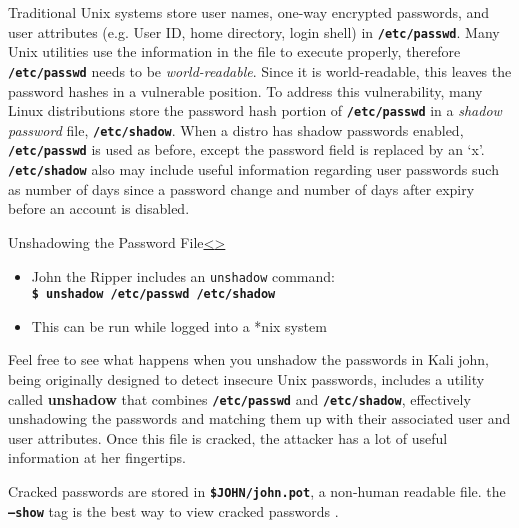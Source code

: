 \documentclass[12pt]{article}
\newcommand{\code}[1]{\texttt{\bfseries#1}}
\newenvironment{instructionblock}{\Large\bgroup}{\egroup}
\begin{document}
Traditional Unix systems store user names, one-way encrypted passwords, and user attributes (e.g. User ID, home directory, login shell) in \code{/etc/passwd}. Many Unix utilities use the information in the file to execute properly, therefore \code{/etc/passwd} needs to be \textit{world-readable}. Since it is world-readable, this leaves the password hashes in a vulnerable position. To address this vulnerability, many Linux distributions store the password hash portion of \code{/etc/passwd} in a \textit{shadow password} file, \code{/etc/shadow}.
When a distro has shadow passwords enabled, \code{/etc/passwd} is used as before, except the password field is replaced by an `x'. \code{/etc/shadow} also may include useful information regarding user passwords such as number of days since a password change and number of days after expiry before an account is disabled. \cite{frampton}

\pagebreak
\begin{slide}{Unshadowing the Password File}{\hyperref[slide 18]{\textless}\hyperref[slide 20]{\textgreater}}
	\begin{instructionblock}
		\begin{itemize}
			\item John the Ripper includes an \texttt{unshadow} command:\\
			\code{\$ unshadow /etc/passwd /etc/shadow}
			\item This can be run while logged into a *nix system
		\end{itemize}
	\end{instructionblock}
\end{slide}
Feel free to see what happens when you unshadow the passwords in Kali
\vfill
john, being originally designed to detect insecure Unix passwords, includes a utility called \textbf{unshadow} that combines \code{/etc/passwd} and \code{/etc/shadow}, effectively unshadowing the passwords and matching them up with their associated user and user attributes. Once this file is cracked, the attacker has a lot of useful information at her fingertips. \cite{john}

Cracked passwords are stored in \code{\$JOHN/john.pot}, a non-human readable file. the \code{--show} tag is the best way to view cracked passwords \cite{john}.
\end{document}
